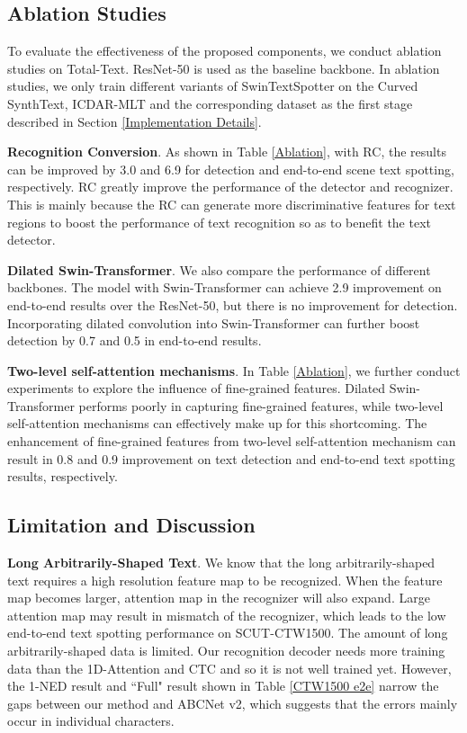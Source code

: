 \documentclass[10pt,twocolumn,letterpaper]{article}
\begin{document}
\subsection{Ablation Studies}
To evaluate the effectiveness of the proposed components, we conduct ablation studies on Total-Text. ResNet-50 is used as the baseline backbone. 
In ablation studies, we only train different variants of SwinTextSpotter on the Curved SynthText, ICDAR-MLT and the corresponding dataset as the first stage described in Section \ref{Implementation Details}.


\textbf{Recognition Conversion}. As shown in Table \ref{Ablation}, with RC, the results can be improved by 3.0 and 6.9 for detection and end-to-end scene text spotting, respectively. RC greatly improve the performance of the detector and recognizer. This is mainly because the RC can generate more discriminative features for text regions to boost the performance of text recognition so as to benefit the text detector.


\textbf{Dilated Swin-Transformer}. We also compare the performance of different backbones. The model with Swin-Transformer can achieve 2.9 improvement on end-to-end results over the ResNet-50, but there is no improvement for detection. Incorporating dilated convolution into Swin-Transformer can further boost detection by 0.7 and 0.5 in end-to-end results.


\textbf{Two-level self-attention mechanisms}. 
In Table \ref{Ablation}, we further conduct experiments to explore the influence of fine-grained features. 
Dilated Swin-Transformer performs poorly in capturing fine-grained features, while two-level self-attention mechanisms can effectively make up for this shortcoming. The enhancement of fine-grained features from two-level self-attention mechanism can result in 0.8 and 0.9 improvement on text detection and end-to-end text spotting results, respectively.


\subsection{Limitation and Discussion}
\label{subsec:discuss}
\textbf{Long Arbitrarily-Shaped Text}. We know that the long arbitrarily-shaped text requires a high resolution feature map to be recognized. When the feature map becomes larger, attention map in the recognizer will also expand. 
Large attention map may result in mismatch of the recognizer, which leads to the low end-to-end text spotting performance on SCUT-CTW1500. The amount of long arbitrarily-shaped data is limited. Our recognition decoder needs more training data than the 1D-Attention\cite{bahdanau2014neural} and CTC\cite{graves2006connectionist} and so it is not well trained yet.
However, the 1-NED result and ``Full" result shown in Table \ref{CTW1500 e2e} narrow the gaps between our method and ABCNet v2, which suggests that the errors mainly occur in individual characters.
\end{document}

